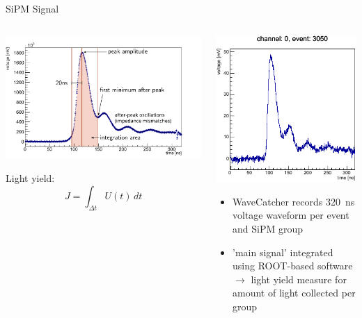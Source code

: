 \documentclass[aspectratio=169]{beamer}
\begin{document}
	
	\begin{frame}{SiPM Signal}
		\vspace{-1cm}
		\begin{columns}
			\begin{column}{.5\textwidth}
				\centering
				\includegraphics[width=1\textwidth]{pictures/integration-window.pdf}
			
				Light yield:
				\begin{equation*}
					J = \int_{\Delta t} U(t) \,dt
				\end{equation*}
				
			\end{column}
		
			\begin{column}{.5\textwidth}
				\centering
				
				\includegraphics[width=.6\textwidth]{pictures/waveform-sipm.pdf}
				\begin{itemize}
					\item WaveCatcher records \SI{320}{\nano\second} voltage waveform per event and SiPM group
					\item 'main signal' integrated using ROOT-based software \cite{ROOTREADER} $\rightarrow$ light yield measure for amount of light collected per group
				\end{itemize}
			\end{column}
		
		\end{columns}
		
	\end{frame}
\end{document}
